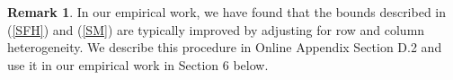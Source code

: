 \documentclass[12pt]{article}
\theoremstyle{definition}
\newtheorem{remark}{Remark}
\begin{document}
\begin{remark}
In our empirical work, we have found that the bounds described in (\ref{SFH}) and (\ref{SM}) are typically improved by adjusting for row and column heterogeneity.  We describe this procedure in Online Appendix Section D.2 and use it in our empirical work in Section 6 below.  
\end{remark}

%
%
%
\end{document}
